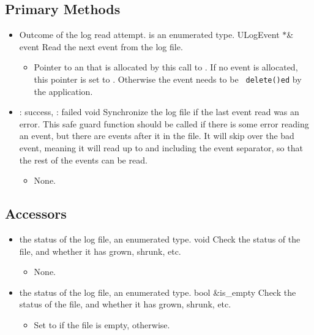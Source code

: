 \subsection{Primary Methods}
\begin{itemize}

\item {}
  {}
  {Outcome of the log read attempt.  is an enumerated
  type.}
  {ULogEvent $*$\& event}
  {Read the next event from the log file.}
  \begin{itemize}
  \item {}
    Pointer to an  that is allocated by this call to
    .
    If no event is allocated, this pointer is
    set to .  Otherwise the event needs to be {\tt
    delete()ed} by the application.
  \end{itemize}

\item {}
  {} {: success, : failed}
  {void}
  {Synchronize the log file if the last event read was an error.  This
    safe guard function should be called if there is some error reading an
    event, but there are events after it in the file.
    It will skip over the
    bad event, meaning it will read up to and including the event separator,
    so that the rest of the events can be read.}
  \begin{itemize}\item None. \end{itemize}

\end{itemize}

\subsection{Accessors}
\begin{itemize}

\item {}
  {}{the status of the log file, an
  enumerated type.}
  {void}
  {Check the status of the file, and whether it has grown, shrunk, etc.}
  \begin{itemize}\item None. \end{itemize}

\item {}
  {} {the status of the log file, an
  enumerated type.}
  {bool \&is\_empty}
  {Check the status of the file, and whether it has grown, shrunk, etc.}
  \begin{itemize}
  \item {}
    Set to  if the file is empty,  otherwise.
  \end{itemize}

\end{itemize}


